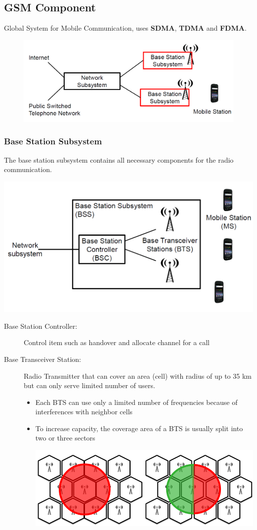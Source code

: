 \subsection{GSM Component}
Global System for Mobile Communication, uses \textbf{SDMA},
\textbf{TDMA} and \textbf{FDMA}.
\begin{figure}[ht!]
    \centering
    \includegraphics[width=0.6\linewidth]{img/gsm.png}
\end{figure}

\subsubsection{Base Station Subsystem}
The base station subsystem contains all necessary components for the radio
communication.

\begin{center}
    \includegraphics[width=0.6\linewidth]{img/bss.png}
\end{center}

\begin{description}
    \item[Base Station Controller:] Control item such as handover and allocate
        channel for a call
    \item[Base Transceiver Station:] Radio Transmitter that can cover an area (cell) with
                radius of up to 35 km but can only serve limited number of users. 
        \begin{itemize} 
            \item Each BTS can use only a limited number of frequencies 
                because of interferences with neighbor cells
            \item To increase capacity, the coverage area of a BTS is usually
                split into two or three sectors
                \begin{center}
                    \includegraphics[width=0.4\linewidth]{img/cellular.png}
                \end{center}
        \end{itemize}


\end{description}


